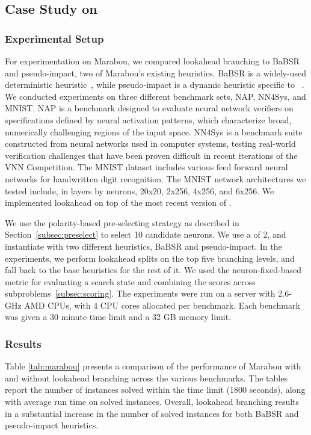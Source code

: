 \documentclass{article}
\begin{document}
\subsection{Case Study on \marabou}

\subsubsection{Experimental Setup}
For experimentation on Marabou, we compared lookahead branching to BaBSR and pseudo-impact, two of Marabou's existing heuristics. BaBSR is a widely-used deterministic heuristic~\cite{bunel2020branch}, while pseudo-impact is a dynamic heuristic specific to \marabou~\cite{wu2022efficient}. We conducted experiments on three different benchmark sets, NAP, NN4Sys, and MNIST. NAP is a benchmark designed to evaluate neural network verifiers on specifications defined by neural activation patterns, which characterize broad, numerically challenging regions of the input space. NN4Sys is a benchmark suite constructed from neural networks used in computer systems, testing real-world verification challenges that have been proven difficult in recent iterations of the VNN Competition. The MNIST dataset includes various feed forward neural networks for handwritten digit recognition. The MNIST network architectures we tested include, in layers by neurons, 20x20, 2x256, 4x256, and 6x256. We implemented lookahead on top of the most recent version of \marabou.

We use the polarity-based pre-selecting strategy as described in Section~\ref{subsec:preselect} to select 10 candidate neurons. We use a \paramDepth of 2, and instantiate \baseSelect with two different heuristics, BaBSR and pseudo-impact. In the experiments, we perform lookahead splits on the top five branching levels, and fall back to the base heuristics for the rest of it. We used the neuron-fixed-based metric for evaluating a search state and combining the scores across subproblems~\ref{subsec:scoring}. The experiments were run on a server with 2.6-GHz AMD CPUs, with 4 CPU cores allocated per benchmark. Each benchmark was given a 30 minute time limit and a 32 GB memory limit. 

\subsubsection{Results}

Table \ref{tab:marabou} presents a comparison of the performance of Marabou with and without lookahead branching across the various benchmarks. The tables report the number of instances solved within the time limit (1800 seconds), along with average run time on solved instances. Overall, lookahead branching results in a substantial increase in the number of solved instances for both BaBSR and pseudo-impact heuristics.
\end{document}
